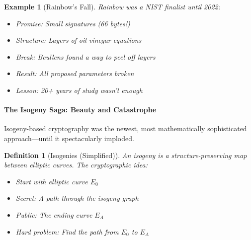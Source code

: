 \documentclass[11pt,a4paper]{article}
\newtheorem{definition}{Definition}
\newtheorem{example}{Example}
\begin{document}
\begin{example}[Rainbow's Fall]
Rainbow was a NIST finalist until 2022:
\begin{itemize}
    \item Promise: Small signatures (66 bytes!)
    \item Structure: Layers of oil-vinegar equations
    \item Break: Beullens found a way to peel off layers
    \item Result: All proposed parameters broken
    \item Lesson: 20+ years of study wasn't enough
\end{itemize}
\end{example}

\paragraph{The Isogeny Saga: Beauty and Catastrophe}

Isogeny-based cryptography was the newest, most mathematically sophisticated approach—until it spectacularly imploded.

\begin{definition}[Isogenies (Simplified)]
An isogeny is a structure-preserving map between elliptic curves. The cryptographic idea:
\begin{itemize}
    \item Start with elliptic curve $E_0$
    \item Secret: A path through the isogeny graph
    \item Public: The ending curve $E_A$
    \item Hard problem: Find the path from $E_0$ to $E_A$
\end{itemize}
\end{definition}
\end{document}
